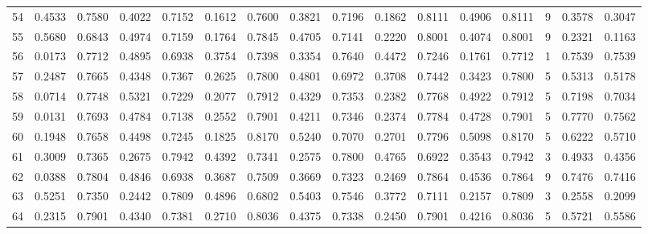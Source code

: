 \begin{tabular}{lrrrrrrrrrrrrrrr}
54  &      0.4533 &  0.7580 &  0.4022 &  0.7152 &  0.1612 &  0.7600 &  0.3821 &  0.7196 &  0.1862 &  0.8111 &   0.4906 &     0.8111 &      9 &                    0.3578 &                     0.3047 \\
55  &      0.5680 &  0.6843 &  0.4974 &  0.7159 &  0.1764 &  0.7845 &  0.4705 &  0.7141 &  0.2220 &  0.8001 &   0.4074 &     0.8001 &      9 &                    0.2321 &                     0.1163 \\
56  &      0.0173 &  0.7712 &  0.4895 &  0.6938 &  0.3754 &  0.7398 &  0.3354 &  0.7640 &  0.4472 &  0.7246 &   0.1761 &     0.7712 &      1 &                    0.7539 &                     0.7539 \\
57  &      0.2487 &  0.7665 &  0.4348 &  0.7367 &  0.2625 &  0.7800 &  0.4801 &  0.6972 &  0.3708 &  0.7442 &   0.3423 &     0.7800 &      5 &                    0.5313 &                     0.5178 \\
58  &      0.0714 &  0.7748 &  0.5321 &  0.7229 &  0.2077 &  0.7912 &  0.4329 &  0.7353 &  0.2382 &  0.7768 &   0.4922 &     0.7912 &      5 &                    0.7198 &                     0.7034 \\
59  &      0.0131 &  0.7693 &  0.4784 &  0.7138 &  0.2552 &  0.7901 &  0.4211 &  0.7346 &  0.2374 &  0.7784 &   0.4728 &     0.7901 &      5 &                    0.7770 &                     0.7562 \\
60  &      0.1948 &  0.7658 &  0.4498 &  0.7245 &  0.1825 &  0.8170 &  0.5240 &  0.7070 &  0.2701 &  0.7796 &   0.5098 &     0.8170 &      5 &                    0.6222 &                     0.5710 \\
61  &      0.3009 &  0.7365 &  0.2675 &  0.7942 &  0.4392 &  0.7341 &  0.2575 &  0.7800 &  0.4765 &  0.6922 &   0.3543 &     0.7942 &      3 &                    0.4933 &                     0.4356 \\
62  &      0.0388 &  0.7804 &  0.4846 &  0.6938 &  0.3687 &  0.7509 &  0.3669 &  0.7323 &  0.2469 &  0.7864 &   0.4536 &     0.7864 &      9 &                    0.7476 &                     0.7416 \\
63  &      0.5251 &  0.7350 &  0.2442 &  0.7809 &  0.4896 &  0.6802 &  0.5403 &  0.7546 &  0.3772 &  0.7111 &   0.2157 &     0.7809 &      3 &                    0.2558 &                     0.2099 \\
64  &      0.2315 &  0.7901 &  0.4340 &  0.7381 &  0.2710 &  0.8036 &  0.4375 &  0.7338 &  0.2450 &  0.7901 &   0.4216 &     0.8036 &      5 &                    0.5721 &                     0.5586 \\

\end{tabular}
